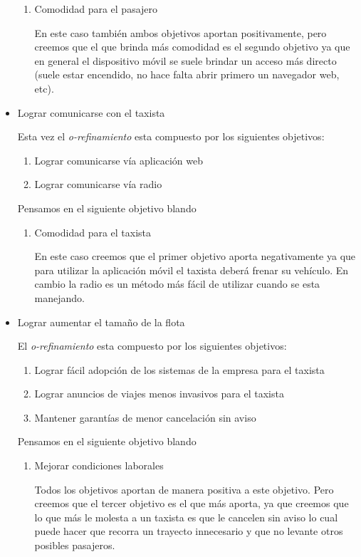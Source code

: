 \documentclass[a4paper, 10pt, twoside]{article}
\begin{document}
\begin{itemize}
\begin{enumerate}
    \item Comodidad para el pasajero
	
      En este caso también ambos objetivos aportan positivamente, pero creemos que el que brinda más comodidad es el segundo objetivo ya que en general el dispositivo móvil se suele brindar un acceso más directo (suele estar encendido, no hace falta abrir primero un navegador web, etc).
  \end{enumerate}
  
\item Lograr comunicarse con el taxista
  
  Esta vez el \emph{o-refinamiento} esta compuesto por los siguientes objetivos:
  
  \begin{enumerate}
    \item Lograr comunicarse vía aplicación web
    \item Lograr comunicarse vía radio
  \end{enumerate}
  
  Pensamos en el siguiente objetivo blando
  
  \begin{enumerate}
  
  \item Comodidad para el taxista
  
      En este caso creemos que el primer objetivo aporta negativamente ya que para utilizar la aplicación móvil el taxista deberá frenar su vehículo. En cambio la radio es un método más fácil de utilizar cuando se esta manejando.
  \end{enumerate}

\item Lograr aumentar el tamaño de la flota
  
  El \emph{o-refinamiento} esta compuesto por los siguientes objetivos:
  
  \begin{enumerate}
    \item Lograr fácil adopción de los sistemas de la empresa para el taxista
    \item Lograr anuncios de viajes menos invasivos para el taxista 
    \item Mantener garantías de menor cancelación sin aviso
  \end{enumerate}
  
  Pensamos en el siguiente objetivo blando
  
  \begin{enumerate}
    \item Mejorar condiciones laborales
  
      Todos los objetivos aportan de manera positiva a este objetivo. Pero creemos que el tercer objetivo es el que más aporta, ya que creemos que lo que más le molesta a un taxista es que le cancelen sin aviso lo cual puede hacer que recorra un trayecto innecesario y que no levante otros posibles pasajeros.
  \end{enumerate}
\end{itemize}
\end{document}
